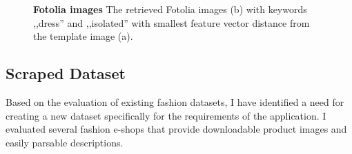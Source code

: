 \documentclass[12pt]{report}
\begin{document}
\begin{figure}[t]
\centering
{}\hspace{1cm}
\caption{\label{fig:fotolia} \textbf{Fotolia images} The retrieved Fotolia images (b) with keywords ,,dress'' and ,,isolated'' with smallest feature vector distance from the template image (a).}
\end{figure}

\pagebreak
\subsection{Scraped Dataset}
Based on the evaluation of existing fashion datasets, I have identified a need for creating a new dataset specifically for the requirements of the application. I evaluated several fashion e-shops that provide downloadable product images and easily parsable descriptions. 
\end{document}
